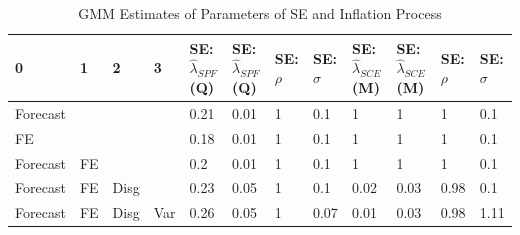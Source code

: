 \documentclass[]{article}
\begin{document}
	\begin{table}
		\centering
	\caption{GMM Estimates of Parameters of SE and Inflation Process}
	\label{GMM_Est_SE_Table}
\begin{tabular}{llllllllllll}
	\hline 
	0        & 1  & 2    & 3   & SE: $\hat\lambda_{SPF}$(Q) & SE: $\hat\lambda_{SPF}$(Q) & SE: $\rho$ & SE: $\sigma$ & SE: $\hat\lambda_{SCE}$(M) & SE: $\hat\lambda_{SCE}$(M) & SE: $\rho$ & SE: $\sigma$ \\
	\hline 
	Forecast &    &      &     & 0.21                       & 0.01                       & 1          & 0.1          & 1                          & 1                          & 1          & 0.1          \\
	\hline 
	FE       &    &      &     & 0.18                       & 0.01                       & 1          & 0.1          & 1                          & 1                          & 1          & 0.1          \\
	\hline 
	Forecast & FE &      &     & 0.2                        & 0.01                       & 1          & 0.1          & 1                          & 1                          & 1          & 0.1          \\
	\hline 
	Forecast & FE & Disg &     & 0.23                       & 0.05                       & 1          & 0.1          & 0.02                       & 0.03                       & 0.98       & 0.1          \\
	\hline 
	Forecast & FE & Disg & Var & 0.26                       & 0.05                       & 1          & 0.07         & 0.01                       & 0.03                       & 0.98       & 1.11        \\
	\hline 
\end{tabular}
\end{table}
\end{document}
